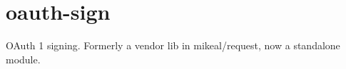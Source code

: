 \chapter{oauth-\/sign}
\hypertarget{md__c_1_2_users_2_s_t_r_i_d_e_r_2source_2repos_2_ainslie_a_p_i_2wwwroot_2lib_2jquery-ui_2node__mdc8b8260e2ca1c71b8b3c8dad3107e7c}{}\label{md__c_1_2_users_2_s_t_r_i_d_e_r_2source_2repos_2_ainslie_a_p_i_2wwwroot_2lib_2jquery-ui_2node__mdc8b8260e2ca1c71b8b3c8dad3107e7c}
OAuth 1 signing. Formerly a vendor lib in mikeal/request, now a standalone module. 